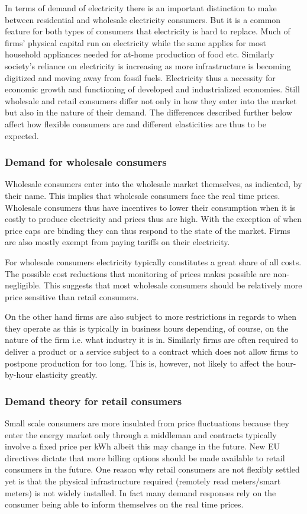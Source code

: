 In terms of demand of electricity there is an important distinction to make between residential and wholesale electricity consumers. But it is a common feature for both types of consumers that electricity is hard to replace. Much of firms' physical capital run on electricity while the same applies for most household appliances needed for at-home production of food etc. Similarly society's reliance on electricity is increasing as more infrastructure is becoming digitized and moving away from fossil fuels. Electricity thus a necessity for economic growth and functioning of developed and industrialized economies. Still wholesale and retail consumers differ not only in how they enter into the market but also in the nature of their demand. The differences described further below affect how flexible consumers are and different elasticities are thus to be expected.

\subsubsection*{Demand for wholesale consumers}
Wholesale consumers enter into the wholesale market themselves, as indicated, by their name. This implies that wholesale consumers face the real time prices. Wholesale consumers thus have incentives to lower their consumption when it is costly to produce electricity and prices thus are high. With the exception of when price caps are binding they can thus respond to the state of the market. Firms are also mostly exempt from paying tariffs on their electricity.
\medskip

For wholesale consumers electricity typically constitutes a great share of all costs. The possible cost reductions that monitoring of prices makes possible are non-negligible. This suggests that most wholesale consumers should be relatively more price sensitive than retail consumers.
\medskip

On the other hand firms are also subject to more restrictions in regards to when they operate as this is typically in business hours depending, of course, on the nature of the firm i.e. what industry it is in. Similarly firms are often required to deliver a product or a service subject to a contract which does not allow firms to postpone production for too long. This is, however, not likely to affect the hour-by-hour elasticity greatly. %

\subsubsection*{Demand theory for retail consumers}
Small scale consumers are more insulated from price fluctuations because they enter the energy market only through a middleman and contracts typically involve a fixed price per kWh albeit this may change in the future. New EU directives dictate that more billing options should be made available to retail consumers in the future. One reason why retail consumers are not flexibly settled yet is that the physical infrastructure required (remotely read meters/smart meters) is not widely installed. In fact many demand responses rely on the consumer being able to inform themselves on the real time prices.
\medskip 

